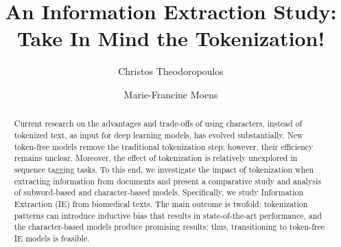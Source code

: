 \documentclass[runningheads]{llncs}
\begin{document}
\title{An Information Extraction Study: Take In Mind the Tokenization!\vspace{-7mm}}
\author{Christos Theodoropoulos\and
Marie-Francine Moens\vspace{-3mm}}

\maketitle              \begin{abstract}
\vspace{-8mm}
Current research on the advantages and trade-offs of using characters, instead of tokenized text, as input for deep learning models, has evolved substantially. New token-free models remove the traditional tokenization step; however, their efficiency remains unclear. Moreover, the effect of tokenization is relatively unexplored in sequence tagging tasks. To this end, we investigate the impact of tokenization when extracting information from documents and present a comparative study and analysis of subword-based and character-based models. Specifically, we study Information Extraction (IE) from biomedical texts. The main outcome is twofold: tokenization patterns can introduce inductive bias that results in state-of-the-art performance, and the character-based models produce promising results; thus, transitioning to token-free IE models is feasible.
\vspace{-4mm}
\vspace{-5mm}
\end{abstract}
\end{document}
